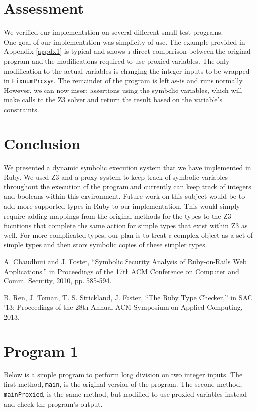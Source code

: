 \documentclass[10pt]{article}
\begin{document}
\section{Assessment}
We verified our implementation on several different small test programs.\\

One goal of our implementation was simplicity of use.  The example provided in Appendix \ref{appdx1} is typical and shows a direct comparison between the original program and the modifications required to use proxied variables.  The only modification to the actual variables is changing the integer inputs to be wrapped in \texttt{FixnumProxy}s.  The remainder of the program is left as-is and runs normally.  However, we can now insert assertions using the symbolic variables, which will make calls to the Z3 solver and return the result based on the variable's constraints.

\section{Conclusion}
We presented a dynamic symbolic execution system  that we have implemented in Ruby.  We used Z3 and a proxy system to keep track of symbolic variables throughout the execution of the program and currently can keep track of integers and booleans within this environment.  Future work on this subject would be to add more supported types in Ruby to our implementation.  This would simply require adding mappings from the original methods for the types to the Z3 fucntions that complete the same action for simple types that exist within Z3 as well.  For more complicated types, our plan is to treat a complex object as a set of simple types and then store symbolic copies of these simpler types.\\

\begin{thebibliography}{99}
A. Chaudhuri and J. Foster, ``Symbolic Security Analysis of Ruby-on-Rails Web Applications,'' in Proceedings of the 17th ACM Conference on Computer and Comm. Security, 2010, pp. 585-594.

B. Ren, J. Toman, T. S. Strickland, J. Foster, ``The Ruby Type Checker,'' in SAC '13: Proceedings of the 28th Annual ACM Symposium on Applied Computing, 2013.

\end{thebibliography}

\appendix

\section{Program 1}
Below is a simple program to perform long division on two integer inputs.  The first method, \texttt{main}, is the original version of the program.  The second method, \texttt{mainProxied}, is the same method, but modified to use proxied variables instead and check the program's output.\\
\end{document}
